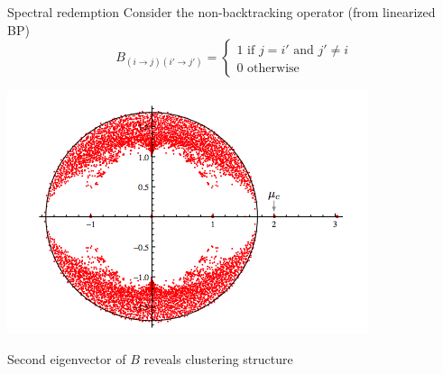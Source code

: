 \documentclass{beamer}
\begin{document}
\begin{frame}{Spectral redemption}
\bigskip
Consider the non-backtracking operator (from linearized BP)
$$B_{(i\to j) (i'\to j')} = \left\{ \begin{matrix} 1 \text { if } j=i' \text{ and } j'\neq i \\ 0 \text{ otherwise}\end{matrix} \right.$$
\begin{center}

\includegraphics[height=.25\textwidth]{figs/nb}
\end{center}
Second eigenvector of $B$ reveals clustering structure
\let\thefootnote\relax{}
\let\thefootnote\relax{}



\end{frame}
\end{document}
